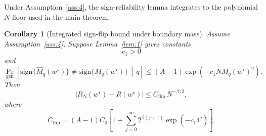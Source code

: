 \documentclass{article} %
\newtheorem{corollary}[theorem]{Corollary}
\providecommand{\Risk}{R}
\providecommand{\Mhat}{\widehat{M}}
\providecommand{\wstar}{w^{\star}}
\begin{document}
Under Assumption~\ref{ass:4}, the sign-reliability lemma integrates to the polynomial \(N\)-floor used in the main theorem.

\begin{corollary}[Integrated sign-flip bound under boundary mass]
\label{cor:app4-integrated}
Assume Assumption~\ref{ass:4}.  Suppose Lemma~\ref{lem:1} gives constants
\begin{equation}
\label{eq:app4-sign-constant}
c_1>0
\end{equation}
and
\begin{equation}
\label{eq:app4-sign-bound-restated}
\Pr_{\mathrm{gen}}\!\left[
\mathrm{sign}\{\Mhat_q(\wstar)\}
\ne
\mathrm{sign}\{M_q(\wstar)\}
\,\middle|\,q
\right]
\le
(A-1)\exp\!\left(-c_1N M_q(\wstar)^2\right).
\end{equation}
Then
\begin{equation}
\label{eq:app4-integrated-bound}
\left|
R_N(\wstar)-\Risk(\wstar)
\right|
\le
C_{\mathrm{flip}}\,N^{-\beta/2},
\end{equation}
where
\begin{equation}
\label{eq:app4-Cflip}
C_{\mathrm{flip}}
=
(A-1)C_0
\left[
1+
\sum_{j=0}^{\infty}
2^{\beta(j+1)}
\exp\!\left(-c_1 4^j\right)
\right].
\end{equation}
\end{corollary}
\end{document}
